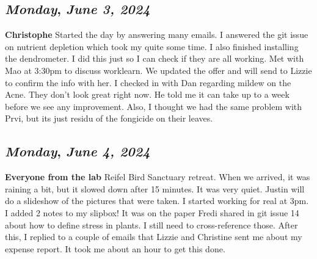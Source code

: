 \begin{center}
\section*{\month}
\end{center}

\def\day{\textit{June 3, 2024}}
\def\weekday{\textit{Monday}}
\subsection*{\weekday, \day}
\textbf{Christophe}
Started the day by answering many emails. I answered the git issue on nutrient depletion which took my quite some time. I also finished installing the dendrometer. I did this just so I can check if they are all working.
Met with Mao at 3:30pm to discuss worklearn. We updated the offer and will send to Lizzie to confirm the info with her. 
I checked in with Dan regarding mildew on the Acne. They don't look great right now. He told me it can take up to a week before we see any improvement. Also, I thought we had the same problem with Prvi, but its just residu of the fongicide on their leaves. 

\def\day{\textit{June 4, 2024}}
\def\weekday{\textit{Monday}}
\subsection*{\weekday, \day}
\textbf {Everyone from the lab}
Reifel Bird Sanctuary retreat. When we arrived, it was raining a bit, but it slowed down after 15 minutes. It was very quiet. Justin will do a slideshow of the pictures that were taken. I started working for real at 3pm. I added 2 notes to my slipbox! It was on the paper Fredi shared in git issue 14 about how to define stress in plants. I still need to cross-reference those. After this, I replied to a couple of emails that Lizzie and Christine sent me about my expense report. It took me about an hour to get this done. 

\def\day{\textit{June 5, 2024}}
\def\weekday{\textit{Monday}}
